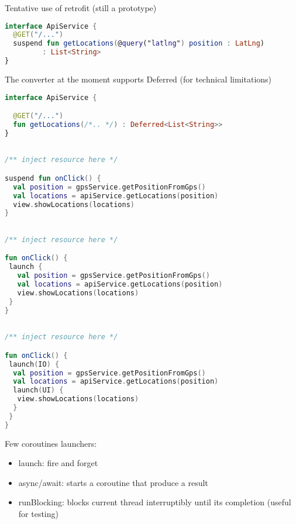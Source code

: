 \documentclass[10pt]{beamer}
\begin{document}
\begin{frame}[fragile]
	Tentative use of retrofit (still a prototype) 
\begin{lstlisting}[language=Kotlin, basicstyle=\ttfamily]
interface ApiService {
  @GET("/...")
  suspend fun getLocations(@query("latlng") position : LatLng) 
	     : List<String> 
}
\end{lstlisting}
	The converter at the moment supports Deferred (for technical limitations) 
\begin{lstlisting}[language=Kotlin, basicstyle=\ttfamily]
interface ApiService {

  @GET("/...")
  fun getLocations(/*.. */) : Deferred<List<String>>
}
\end{lstlisting}
\end{frame}
\begin{frame}[fragile]
\begin{lstlisting}[language=Kotlin, basicstyle=\ttfamily]

/** inject resource here */

suspend fun onClick() {
  val position = gpsService.getPositionFromGps()
  val locations = apiService.getLocations(position)
  view.showLocations(locations)
}
\end{lstlisting}
\end{frame}

\begin{frame}[fragile]
\begin{lstlisting}[language=Kotlin, basicstyle=\ttfamily]

/** inject resource here */

fun onClick() {
 launch {
   val position = gpsService.getPositionFromGps()
   val locations = apiService.getLocations(position)
   view.showLocations(locations)
 }
}
\end{lstlisting}
\end{frame}
\begin{frame}[fragile]
\begin{lstlisting}[language=Kotlin, basicstyle=\ttfamily]

/** inject resource here */

fun onClick() {
 launch(IO) {
  val position = gpsService.getPositionFromGps()
  val locations = apiService.getLocations(position)
  launch(UI) {
   view.showLocations(locations)
  }
 }
}
\end{lstlisting}
\end{frame}

\begin{frame}
Few coroutines launchers:	
	\begin{itemize}
		\item  launch: fire and forget
		\item async/await: starts a coroutine that produce a result 
		\item runBlocking:  blocks current thread interruptibly until its completion (useful for testing) 
	\end{itemize}

\end{frame}
\end{document}
